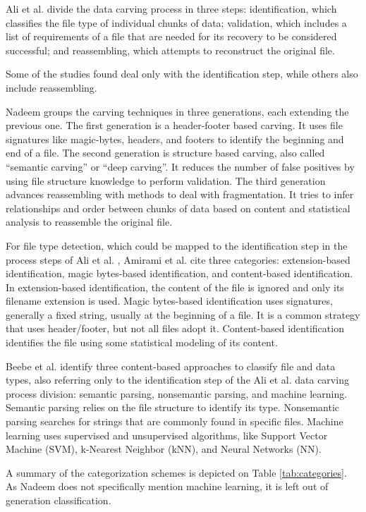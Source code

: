 Ali et al. \cite{ali_review_2018} divide the data carving process in three steps:
    identification, which classifies the file type of individual chunks of data; 
    validation, which includes a list of requirements of a file that are needed for its recovery to be considered successful; and
    reassembling, which attempts to reconstruct the original file.

Some of the studies found deal only with the identification step, while others also include reassembling.

Nadeem \cite{nadeem_ashraf_forensic_2013} groups the carving techniques in three generations, each extending the previous one.
The first generation is a header-footer based carving. It uses file signatures like magic-bytes, headers, and footers to identify the beginning and end of a file.
The second generation is structure based carving, also called ``semantic carving'' or ``deep carving''. It reduces the number of false positives by using file structure knowledge to perform validation.
The third generation advances reassembling with methods to deal with fragmentation. It tries to infer relationships and order between chunks of data based on content and statistical analysis to reassemble the original file.

For file type detection, which could be mapped to the identification step in the  process steps of Ali et al. \cite{ali_review_2018}, Amirami et al. \cite{amirani_new_2008} cite three categories: extension-based identification, magic bytes-based identification, and content-based identification.
In extension-based identification, the content of the file is ignored and only its filename extension is used. Magic bytes-based identification uses signatures, generally a fixed string, usually at the beginning of a file. It is a common strategy that uses header/footer, but not all files adopt it. Content-based identification identifies the file using some statistical modeling of its content.

Beebe et al. \cite{beebe_sceadan:_2013} identify three content-based approaches to classify file and data types, also referring only to the identification step of the Ali et al. \cite{ali_review_2018} data carving process division: semantic parsing, nonsemantic parsing, and machine learning. Semantic parsing relies on the file structure to identify its type. Nonsemantic parsing searches for strings that are commonly found in specific files. Machine learning uses supervised and unsupervised algorithms, like Support Vector Machine (SVM), k-Nearest Neighbor (kNN), and Neural Networks (NN).

A summary of the categorization schemes is depicted on Table \ref{tab:categories}. As Nadeem \cite{nadeem_ashraf_forensic_2013} does not specifically mention machine learning, it is left out of generation classification.

